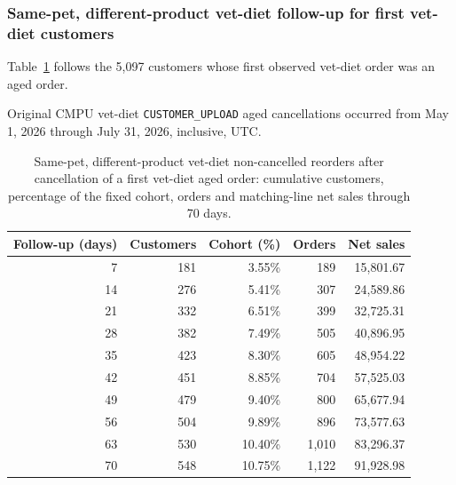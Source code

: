 \clearpage
\subsubsection{Same-pet, different-product vet-diet follow-up for first vet-diet customers}
Table~\ref{tab:financial-opportunity-new-vet-diet-same-pet-different-part} follows the
5,097 customers whose first observed vet-diet order was an aged order.

Original CMPU vet-diet
\texttt{CUSTOMER\_UPLOAD} aged cancellations occurred from
May 1, 2026 through July 31, 2026, inclusive, UTC.

\begin{table}[!htbp]
\centering
\caption{Same-pet, different-product vet-diet non-cancelled reorders after cancellation of a first vet-diet aged order: cumulative customers, percentage of the fixed cohort, orders and matching-line net sales through 70 days.}
\label{tab:financial-opportunity-new-vet-diet-same-pet-different-part}
\begin{tabular}{@{}rrrrr@{}}
\toprule
Follow-up (days) & Customers & Cohort (\%) & Orders & Net sales \\
\midrule
7 & 181 & 3.55\% & 189 & 15,801.67 \\
14 & 276 & 5.41\% & 307 & 24,589.86 \\
21 & 332 & 6.51\% & 399 & 32,725.31 \\
28 & 382 & 7.49\% & 505 & 40,896.95 \\
35 & 423 & 8.30\% & 605 & 48,954.22 \\
42 & 451 & 8.85\% & 704 & 57,525.03 \\
49 & 479 & 9.40\% & 800 & 65,677.94 \\
56 & 504 & 9.89\% & 896 & 73,577.63 \\
63 & 530 & 10.40\% & 1,010 & 83,296.37 \\
70 & 548 & 10.75\% & 1,122 & 91,928.98 \\
\bottomrule
\end{tabular}


\end{table}
